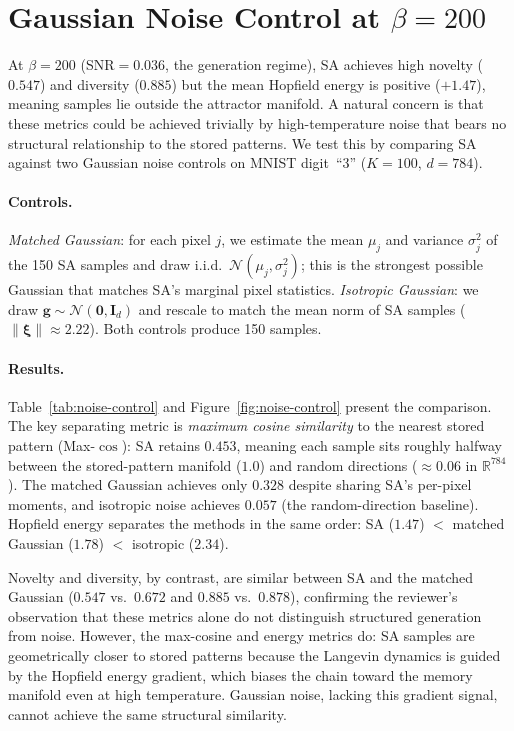 \section{Gaussian Noise Control at $\beta{=}200$}\label{app:noise-control}

At $\beta{=}200$ (SNR$=0.036$, the generation regime), SA achieves high novelty ($0.547$) and diversity ($0.885$) but the mean Hopfield energy is positive ($+1.47$), meaning samples lie outside the attractor manifold. A natural concern is that these metrics could be achieved trivially by high-temperature noise that bears no structural relationship to the stored patterns. We test this by comparing SA against two Gaussian noise controls on MNIST digit~``3'' ($K{=}100$, $d{=}784$).

\paragraph{Controls.}
\emph{Matched Gaussian}: for each pixel $j$, we estimate the mean $\mu_j$ and variance $\sigma_j^2$ of the 150 SA samples and draw i.i.d.\ $\mathcal{N}(\mu_j, \sigma_j^2)$; this is the strongest possible Gaussian that matches SA's marginal pixel statistics. \emph{Isotropic Gaussian}: we draw $\mathbf{g}\sim\mathcal{N}(\mathbf{0},\mathbf{I}_d)$ and rescale to match the mean norm of SA samples ($\lVert\boldsymbol{\xi}\rVert\approx 2.22$). Both controls produce 150 samples.

\paragraph{Results.}
Table~\ref{tab:noise-control} and Figure~\ref{fig:noise-control} present the comparison. The key separating metric is \emph{maximum cosine similarity} to the nearest stored pattern (Max-$\cos$): SA retains $0.453$, meaning each sample sits roughly halfway between the stored-pattern manifold ($1.0$) and random directions (${\approx}0.06$ in $\mathbb{R}^{784}$). The matched Gaussian achieves only $0.328$ despite sharing SA's per-pixel moments, and isotropic noise achieves $0.057$ (the random-direction baseline). Hopfield energy separates the methods in the same order: SA ($1.47$) $<$ matched Gaussian ($1.78$) $<$ isotropic ($2.34$).

Novelty and diversity, by contrast, are similar between SA and the matched Gaussian ($0.547$ vs.\ $0.672$ and $0.885$ vs.\ $0.878$), confirming the reviewer's observation that these metrics alone do not distinguish structured generation from noise. However, the max-cosine and energy metrics do: SA samples are geometrically closer to stored patterns because the Langevin dynamics is guided by the Hopfield energy gradient, which biases the chain toward the memory manifold even at high temperature. Gaussian noise, lacking this gradient signal, cannot achieve the same structural similarity.

